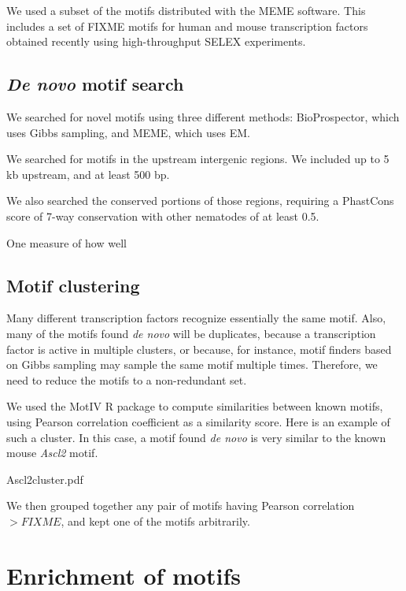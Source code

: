 \documentclass{article}
\begin{document}
We used a subset of the motifs distributed with the MEME software.
This includes a set of FIXME motifs for human and mouse transcription
factors obtained recently using
high-throughput SELEX experiments.




\subsection*{{\em De novo} motif search}

We searched for novel motifs using three different methods:
BioProspector, which uses Gibbs sampling, and MEME, which uses EM.

We searched for motifs in the upstream intergenic regions.
We included
up to 5 kb upstream, and at least 500 bp.

We also searched the conserved portions of those regions,
requiring a PhastCons score of 7-way conservation with other nematodes
of at least 0.5.

One measure of how well



\subsection*{Motif clustering}

Many different transcription factors recognize essentially the same
motif. Also, many of the motifs found {\em de novo} will be duplicates,
because a transcription factor is active in multiple clusters, or because,
for instance, motif finders based on Gibbs sampling may sample the same
motif multiple times. Therefore, we need to reduce the motifs to a
non-redundant set.

We used the MotIV R package to compute similarities between known
motifs, using Pearson correlation coefficient as a similarity score.
Here is an example of such a cluster. In this case, a motif found
{\em de novo} is very similar to the known mouse {\em Ascl2} motif.


Ascl2cluster.pdf



We then grouped together any pair of motifs having Pearson correlation
$ > FIXME$, and kept one of the motifs arbitrarily.

\section*{Enrichment of motifs}
\end{document}
